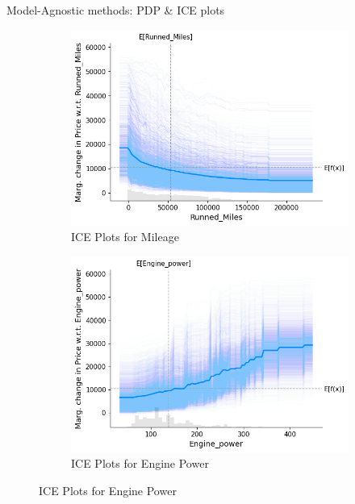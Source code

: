 \documentclass{beamer}
\begin{document}
\begin{frame}{Model-Agnostic methods: PDP \& ICE plots}
  \begin{figure}[h]
    \centering
    \begin{subfigure}{0.38\textwidth}
      \includegraphics[width=\linewidth]{ice_runnedmiles.png}
      \caption{ICE Plots for Mileage}
      \label{ice_runnedmiles}
    \end{subfigure}
    \hfill
    \begin{subfigure}{0.38\textwidth}
      \includegraphics[width=\linewidth]{ice_enginepower.png}
      \caption{ICE Plots for Engine Power}
      \label{ice_enginepower}
    \end{subfigure}

    \medskip


\end{figure}
\end{frame}
\end{document}
